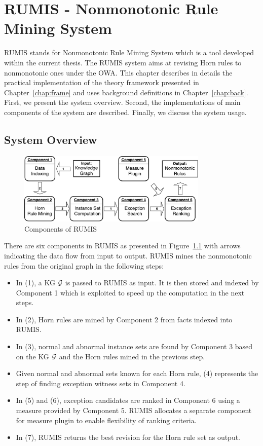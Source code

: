\chapter{RUMIS - Nonmonotonic Rule Mining System}\label{chap:system}
\label{chap:system}

RUMIS stands for Nonmonotonic Rule Mining System which is a tool developed within the current thesis. The RUMIS system aims at revising Horn rules to nonmonotonic ones under the OWA. This chapter describes in details the practical implementation of the theory framework presented in Chapter~\ref{chap:frame} and uses background definitions in Chapter~\ref{chap:back}. First, we present the system overview. Second, the implementations of main components of the system are described. Finally, we discuss the system usage.

\section{System Overview}
\label{sec:overview}

\begin{figure}[h]
\centering
\includegraphics[width=0.81\textwidth]{figures/system_overview}
\caption{Components of RUMIS}
\label{system_overview}
\end{figure}

There are six components in RUMIS as presented in Figure~\ref{system_overview} with arrows indicating the data flow from input to output. RUMIS mines the nonmonotonic rules from the original graph in the following steps:

\begin{itemize}
\item In (1), a KG $\mathcal{G}$ is passed to RUMIS as input. It is then stored and indexed by Component 1 which is exploited to speed up the computation in the next steps.
\item In (2), Horn rules are mined by Component 2 from facts indexed into RUMIS.
\item In (3), normal and abnormal instance sets are found by Component 3 based on the KG $\mathcal{G}$ and the Horn rules mined in the previous step.
\item Given normal and abnormal sets known for each Horn rule, (4) represents the step of finding exception witness sets in Component 4.
\item In (5) and (6), exception candidates are ranked in Component 6 using a measure provided by Component 5. RUMIS allocates a separate component for measure plugin to enable flexibility of ranking criteria.
\item In (7), RUMIS returns the best revision for the Horn rule set as output.
\end{itemize}

